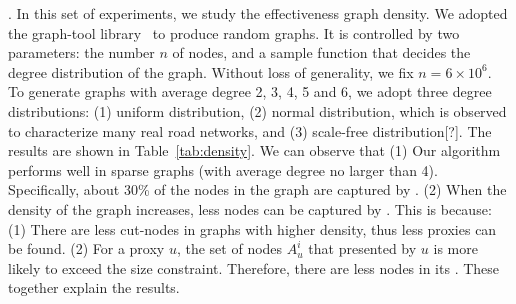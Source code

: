 .
In this set of experiments, we study the effectiveness \wrt graph density. We adopted the graph-tool library~\cite{peixoto_graph-tool_2014} to produce random graphs. It is controlled by two parameters: the number $n$ of nodes, and a sample function that decides the degree distribution of the graph. Without loss of generality, we fix $n=6\times 10^6$. To generate graphs with average degree 2, 3, 4, 5 and 6, we adopt three degree distributions: (1) uniform distribution, (2) normal distribution, which is observed to characterize many real road networks\cite{progulova2008modeling}, and (3) scale-free distribution[?]. The results are shown in Table~\ref{tab:density}. We can observe that (1) Our algorithm performs well in sparse graphs (with average degree no larger than 4). Specifically, about 30\% of the nodes in the graph are captured by \dras. (2) When the density of the graph increases, less nodes can be captured by \dras. This is because: (1) There are less cut-nodes in graphs with higher density, thus less proxies can be found. (2) For a proxy $u$, the set of nodes $A_u^i$ that presented by $u$ is more likely to exceed the size constraint. Therefore, there are less nodes in its \dra. These together explain the results.

